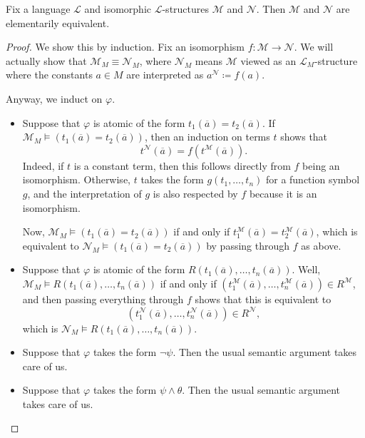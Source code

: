 \documentclass[../notes.tex]{subfiles}
\begin{document}
\begin{proposition} \label{prop:iso-is-equiv}
	Fix a language $\mathcal L$ and isomorphic $\mathcal L$-structures $\mathcal M$ and $\mathcal N$. Then $\mathcal M$ and $\mathcal N$ are elementarily equivalent.
\end{proposition}
\begin{proof}
	We show this by induction. Fix an isomorphism $f\colon\mathcal M\to\mathcal N$. We will actually show that $\mathcal M_M\equiv\mathcal N_M$, where $\mathcal N_M$ means $\mathcal M$ viewed as an $\mathcal L_M$-structure where the constants $a\in M$ are interpreted as $a^\mathcal N\coloneqq f(a)$.

	Anyway, we induct on $\varphi$.
	\begin{itemize}
		\item Suppose that $\varphi$ is atomic of the form $t_1(\overline a)=t_2(\overline a)$. If $\mathcal M_M\models(t_1(\overline a)=t_2(\overline a))$, then an induction on terms $t$ shows that
		\[t^\mathcal N(\overline a)=f\left(t^\mathcal M(\overline a)\right).\]
		Indeed, if $t$ is a constant term, then this follows directly from $f$ being an isomorphism. Otherwise, $t$ takes the form $g(t_1,\ldots,t_n)$ for a function symbol $g$, and the interpretation of $g$ is also respected by $f$ because it is an isomorphism.

		Now, $\mathcal M_M\models(t_1(\overline a)=t_2(\overline a))$ if and only if $t_1^\mathcal M(\overline a)=t_2^\mathcal M(\overline a)$, which is equivalent to $\mathcal N_M\models(t_1(\overline a)=t_2(\overline a))$ by passing through $f$ as above.

		\item Suppose that $\varphi$ is atomic of the form $R(t_1(\overline a),\ldots,t_n(\overline a))$. Well, $\mathcal M_M\models R(t_1(\overline a),\ldots,t_n(\overline a))$ if and only if $\left(t_1^\mathcal M(\overline a),\ldots,t_n^\mathcal M(\overline a)\right)\in R^\mathcal M$, and then passing everything through $f$ shows that this is equivalent to
		\[\left(t_1^\mathcal N(\overline a),\ldots,t_n^\mathcal N(\overline a)\right)\in R^\mathcal N,\]
		which is $\mathcal N_M\models R(t_1(\overline a),\ldots,t_n(\overline a))$.

		\item Suppose that $\varphi$ takes the form $\lnot\psi$. Then the usual semantic argument takes care of us.

		\item Suppose that $\varphi$ takes the form $\psi\land\theta$. Then the usual semantic argument takes care of us.


\end{itemize}
\end{proof}
\end{document}
